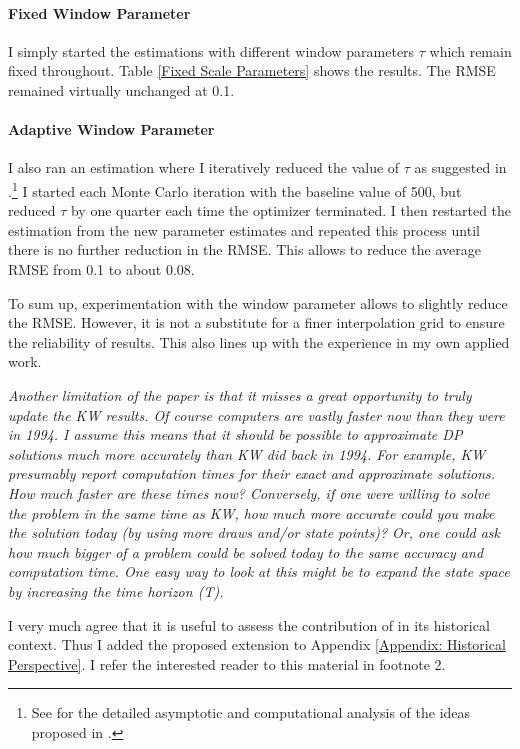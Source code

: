 \begin{boenumerate}
\paragraph{Fixed Window Parameter} I simply started the estimations with different window parameters $\tau$ which remain fixed throughout. Table \ref{Fixed Scale Parameters} shows the results. The RMSE remained virtually unchanged at 0.1.



\paragraph{Adaptive Window Parameter} I also ran an estimation where I iteratively reduced the value of $\tau$ as suggested in \citet{Keane.2003}.\footnote{See \citet{Bruins.2015} for the detailed asymptotic and computational analysis of the ideas proposed in \citet{Keane.2003}.} I started each Monte Carlo iteration with the baseline value of 500, but reduced $\tau$ by one quarter each time the optimizer terminated. I then restarted the estimation from the new parameter estimates and repeated this process until there is no further reduction in the RMSE. This allows to reduce the average RMSE from 0.1 to about 0.08.\newline

To sum up, experimentation with the window parameter allows to slightly reduce the RMSE. However, it is not a substitute for a finer interpolation grid to ensure the reliability of results. This also lines up with the experience in my own applied work.\newline
\item \textit{Another limitation of the paper is that it misses a great opportunity to truly update the KW results. Of course computers are vastly faster now than they were in 1994. I assume this means that it should be possible to approximate DP solutions much more accurately than KW did back in 1994. For example, KW presumably report computation times for their exact and approximate solutions. How much faster are these times now? Conversely, if one were willing to solve the problem in the same time as KW, how much more accurate could you make the solution today (by using more draws and/or state points)? Or, one could ask how much bigger of a problem could be solved today to the same accuracy and computation time. One easy way to look at this might be to expand the state space by increasing the time horizon (T).}\vspace{0.5cm}

I very much agree that it is useful to assess the contribution of \citet{Keane.1994} in its historical context. Thus I added the proposed extension to Appendix \ref{Appendix: Historical Perspective}. I refer the interested reader to this material in footnote 2.
\end{boenumerate}

